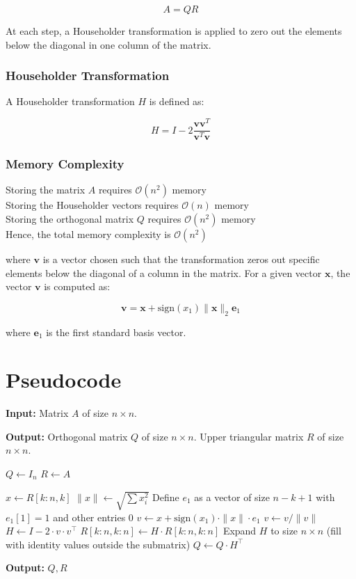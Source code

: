 \documentclass[final]{article}
\begin{document}
\[
A = QR
\]

At each step, a Householder transformation is applied to zero out the elements below the diagonal in one column of the matrix.

\subsubsection{Householder Transformation}

A Householder transformation $ H $ is defined as:

\[
H = I - 2 \frac{\mathbf{v} \mathbf{v}^T}{\mathbf{v}^T \mathbf{v}}
\]
\subsubsection{Memory Complexity}
Storing the matrix $ A $ requires $ \mathcal{O}(n^2) $ memory \\
Storing the Householder vectors requires $ \mathcal{O}(n) $ memory \\
Storing the orthogonal matrix $ Q $ requires $ \mathcal{O}(n^2) $ memory \\
Hence, the total memory complexity is $ \mathcal{O}(n^2) $

where $ \mathbf{v} $ is a vector chosen such that the transformation zeros out specific elements below the diagonal of a column in the matrix. For a given vector $ \mathbf{x} $, the vector $ \mathbf{v} $ is computed as:

\[
\mathbf{v} = \mathbf{x} + \text{sign}(x_1) \|\mathbf{x}\|_2 \mathbf{e}_1
\]

where $ \mathbf{e}_1 $ is the first standard basis vector.
\section*{Pseudocode}

\textbf{Input:}  
Matrix $A$ of size $n \times n$.

\textbf{Output:}  
Orthogonal matrix $Q$ of size $n \times n$.  
Upper triangular matrix $R$ of size $n \times n$.

\begin{algorithmic}
\State $Q \gets I_n$ 
\State $R \gets A$ 

    \State $x \gets R[k:n, k]$ 
    \State $\|x\| \gets \sqrt{\sum x_i^2}$ 
    \State Define $e_1$ as a vector of size $n-k+1$ with $e_1[1] = 1$ and other entries 0
    \State $v \gets x + \text{sign}(x_1) \cdot \|x\| \cdot e_1$ 
    \State $v \gets v / \|v\|$ 
    \State $H \gets I - 2 \cdot v \cdot v^\top$ 
    \State $R[k:n, k:n] \gets H \cdot R[k:n, k:n]$ 
    \State Expand $H$ to size $n \times n$ (fill with identity values outside the submatrix)
    \State $Q \gets Q \cdot H^\top$ 
\EndFor

\State \textbf{Output:} $Q, R$
\end{algorithmic}
\end{document}
